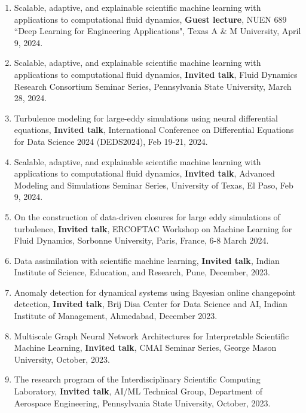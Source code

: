 \documentclass[letterpaper]{article}
\begin{document}
\begin{enumerate}

\item Scalable, adaptive, and explainable scientific machine learning with applications to computational fluid dynamics, \textbf{Guest lecture}, NUEN 689 ``Deep Learning for Engineering Applications", Texas A \& M University, April 9, 2024.

\item Scalable, adaptive, and explainable scientific machine learning with applications to computational fluid dynamics, \textbf{Invited talk}, Fluid Dynamics Research Consortium Seminar Series, Pennsylvania State University, March 28, 2024.

\item Turbulence modeling for large-eddy simulations using neural differential equations, \textbf{Invited talk}, International Conference on Differential Equations for Data Science 2024 (DEDS2024), Feb 19-21, 2024.

\item Scalable, adaptive, and explainable scientific machine learning with applications to computational fluid dynamics, \textbf{Invited talk}, Advanced Modeling and Simulations Seminar Series, University of Texas, El Paso, Feb 9, 2024.

\item On the construction of data-driven closures for large eddy simulations of turbulence, \textbf{Invited talk}, ERCOFTAC Workshop on Machine Learning for Fluid Dynamics, Sorbonne University, Paris, France, 6-8 March 2024.

\item Data assimilation with scientific machine learning, \textbf{Invited talk}, Indian Institute of Science, Education, and Research, Pune, December, 2023.

\item Anomaly detection for dynamical systems using Bayesian online changepoint detection, \textbf{Invited talk}, Brij Disa Center for Data Science and AI, Indian Institute of Management, Ahmedabad, December 2023.

\item Multiscale Graph Neural Network Architectures for Interpretable Scientific Machine Learning, \textbf{Invited talk}, CMAI Seminar Series, George Mason University, October, 2023.

\item The research program of the Interdisciplinary Scientific Computing Laboratory, \textbf{Invited talk}, AI/ML Technical Group, Department of Aerospace Engineering, Pennsylvania State University, October, 2023.


\end{enumerate}
\end{document}

